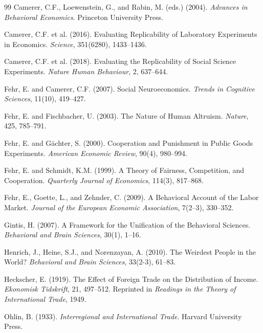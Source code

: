 \documentclass[12pt,a4paper]{article}
\begin{document}
\begin{thebibliography}{99}
Camerer, C.F., Loewenstein, G., and Rabin, M. (eds.) (2004).
\emph{Advances in Behavioral Economics}.
Princeton University Press.

Camerer, C.F. et al. (2016).
Evaluating Replicability of Laboratory Experiments in Economics.
\emph{Science}, 351(6280), 1433–1436.

Camerer, C.F. et al. (2018).
Evaluating the Replicability of Social Science Experiments.
\emph{Nature Human Behaviour}, 2, 637–644.

Fehr, E. and Camerer, C.F. (2007).
Social Neuroeconomics.
\emph{Trends in Cognitive Sciences}, 11(10), 419–427.

Fehr, E. and Fischbacher, U. (2003).
The Nature of Human Altruism.
\emph{Nature}, 425, 785–791.

Fehr, E. and Gächter, S. (2000).
Cooperation and Punishment in Public Goods Experiments.
\emph{American Economic Review}, 90(4), 980–994.

Fehr, E. and Schmidt, K.M. (1999).  
A Theory of Fairness, Competition, and Cooperation.  
\emph{Quarterly Journal of Economics}, 114(3), 817–868.

Fehr, E., Goette, L., and Zehnder, C. (2009).
A Behavioral Account of the Labor Market.
\emph{Journal of the European Economic Association}, 7(2–3), 330–352.

Gintis, H. (2007).
A Framework for the Unification of the Behavioral Sciences.
\emph{Behavioral and Brain Sciences}, 30(1), 1–16.

Henrich, J., Heine, S.J., and Norenzayan, A. (2010).
The Weirdest People in the World?
\emph{Behavioral and Brain Sciences}, 33(2-3), 61–83.

Heckscher, E. (1919).
The Effect of Foreign Trade on the Distribution of Income.
\emph{Ekonomisk Tidskrift}, 21, 497–512.
Reprinted in \emph{Readings in the Theory of International Trade}, 1949.

Ohlin, B. (1933).
\emph{Interregional and International Trade}.
Harvard University Press.


\end{thebibliography}
\end{document}
